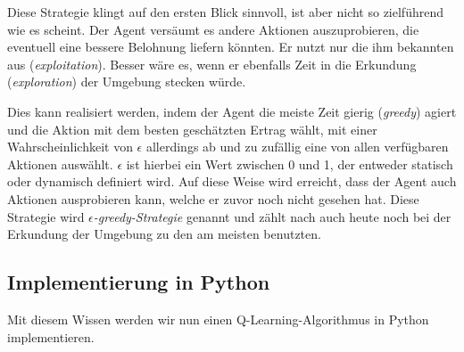 Diese Strategie klingt auf den ersten Blick sinnvoll, ist aber nicht so zielführend wie es scheint. Der Agent versäumt es andere Aktionen auszuprobieren, die eventuell eine bessere Belohnung liefern könnten. Er nutzt nur die ihm bekannten aus (\textit{exploitation}). Besser wäre es, wenn er ebenfalls Zeit in die Erkundung (\textit{exploration}) der Umgebung stecken würde.

Dies kann realisiert werden, indem der Agent die meiste Zeit \glqq gierig\grqq{} (\textit{greedy}) agiert und die Aktion mit dem besten geschätzten Ertrag wählt, mit einer Wahrscheinlichkeit von $ \epsilon $ allerdings ab und zu zufällig eine von allen verfügbaren Aktionen auswählt. $ \epsilon $ ist hierbei ein Wert zwischen 0 und 1, der entweder statisch oder dynamisch definiert wird. Auf diese Weise wird erreicht, dass der Agent auch Aktionen ausprobieren kann, welche er zuvor noch nicht gesehen hat. Diese Strategie wird \textit{$ \epsilon $-greedy-Strategie} genannt und zählt nach \cite{07_dabney2020temporallyextended} auch heute noch bei der Erkundung der Umgebung zu den am meisten benutzten.

\subsection{Implementierung in Python} \label{sec:qLearningImplementation}
Mit diesem Wissen werden wir nun einen Q-Learning-Algorithmus in Python implementieren.

